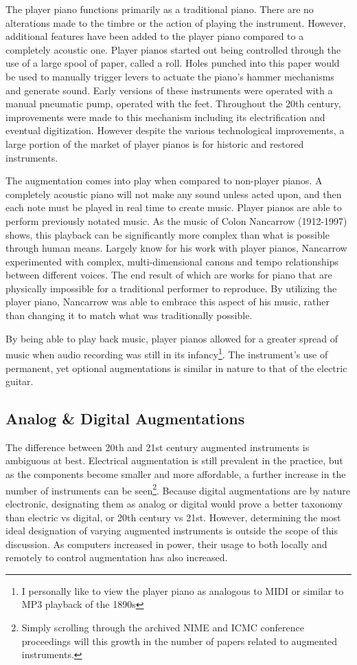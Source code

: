 The player piano functions primarily as a traditional piano. There are no alterations made to the timbre or the action of playing the instrument. However, additional features have been added to the player piano compared to a completely acoustic one. Player pianos started out being controlled through the use of a large spool of paper, called a roll. Holes punched into this paper would be used to manually trigger levers to actuate the piano's hammer mechanisms and generate sound. Early versions of these instruments were operated with a manual pneumatic pump, operated with the feet. Throughout the 20th century, improvements were made to this mechanism including its electrification and eventual digitization. However despite the various technological improvements, a large portion of the market of player pianos is for historic and restored instruments.

The augmentation comes into play when compared to non-player pianos. A completely acoustic piano will not make any sound unless acted upon, and then each note must be played in real time to create music. Player pianos are able to perform previously notated music. As the music of Colon Nancarrow (1912-1997) shows, this playback can be significantly more complex than what is possible through human means. Largely know for his work with player pianos, Nancarrow experimented with complex, multi-dimensional canons and tempo relationships between different voices. The end result of which are works for piano that are physically impossible for a traditional performer to reproduce. By utilizing the player piano, Nancarrow was able to embrace this aspect of his music, rather than changing it to match what was traditionally possible.

By being able to play back music, player pianos allowed for a greater spread of music when audio recording was still in its infancy\footnote{I personally like to view the player piano as analogous to MIDI or similar to MP3 playback of the 1890s}. The instrument's use of permanent, yet optional augmentations is similar in nature to that of the electric guitar.



\subsection{ Analog \& Digital Augmentations}
The difference between 20th and 21st century augmented instruments is ambiguous at best. Electrical augmentation is still prevalent in the practice, but as the components become smaller and more affordable, a further increase in the number of instruments can be seen\footnote{Simply scrolling through the archived NIME and ICMC conference  proceedings will this growth in the number of papers related to augmented instruments.}. Because digital augmentations are by nature electronic, designating them as analog or digital would prove a better taxonomy than electric vs digital, or 20th century vs 21st. However, determining the most ideal designation of varying augmented instruments is outside the scope of this discussion. As computers increased in power, their usage to both locally and remotely to control augmentation has also increased.

